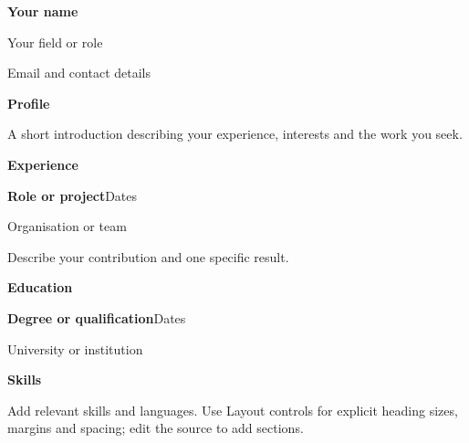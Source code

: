 \documentclass[11pt]{article}
\begin{document}
{\fontsize{22}{26}\selectfont\textbf{Your name}}\par
Your field or role\par
Email and contact details

\vspace{5mm}
{\fontsize{14}{17}\selectfont\textbf{Profile}}\par
A short introduction describing your experience, interests and the work you seek.

\vspace{4mm}
{\fontsize{14}{17}\selectfont\textbf{Experience}}\par
\textbf{Role or project}\hfill Dates\par
Organisation or team\par
Describe your contribution and one specific result.

\vspace{4mm}
{\fontsize{14}{17}\selectfont\textbf{Education}}\par
\textbf{Degree or qualification}\hfill Dates\par
University or institution

\vspace{4mm}
{\fontsize{14}{17}\selectfont\textbf{Skills}}\par
Add relevant skills and languages. Use Layout controls for explicit heading sizes,
margins and spacing; edit the source to add sections.
\end{document}
